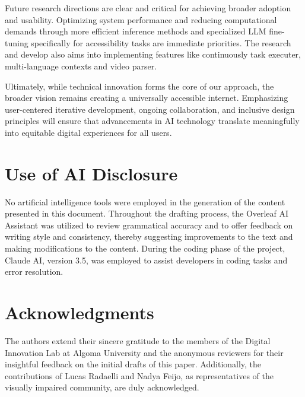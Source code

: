 \documentclass[conference]{IEEEtran}
\begin{document}
Future research directions are clear and critical for achieving broader adoption and usability. Optimizing system performance and reducing computational demands through more efficient inference methods and specialized LLM fine-tuning specifically for accessibility tasks are immediate priorities. The research and develop also aims into implementing features like continuously task executer, multi-language contexts and video parser.

Ultimately, while technical innovation forms the core of our approach, the broader vision remains creating a universally accessible internet. Emphasizing user-centered iterative development, ongoing collaboration, and inclusive design principles will ensure that advancements in AI technology translate meaningfully into equitable digital experiences for all users.


\section*{Use of AI Disclosure}\label{ai-disclosure}
No artificial intelligence tools were employed in the generation of the content presented in this document. Throughout the drafting process, the Overleaf AI Assistant was utilized to review grammatical accuracy and to offer feedback on writing style and consistency, thereby suggesting improvements to the text and making modifications to the content. During the coding phase of the project, Claude AI, version 3.5, was employed to assist developers in coding tasks and error resolution.


\section*{Acknowledgments}\label{ai-disclosure}
The authors extend their sincere gratitude to the members of the Digital Innovation Lab at Algoma University and the anonymous reviewers for their insightful feedback on the initial drafts of this paper. Additionally, the contributions of Lucas Radaelli and Nadya Feijo, as representatives of the visually impaired community, are duly acknowledged.

\vfill


\end{document}
